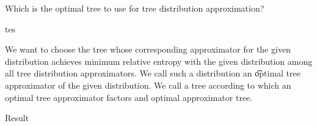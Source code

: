 

















\sstart
{}


Which is the optimal tree to use for tree distribution approximation?

tes

We want to choose the tree whose corresponding approximator for the given distribution achieves minimum relative entropy with the given distribution among all tree distribution approximators.
We call such a distribution an \t{optimal tree approximator} of the given distribution.
We call a tree according to which an optimal tree approximator factors and optimal approximator tree.

{Result}

